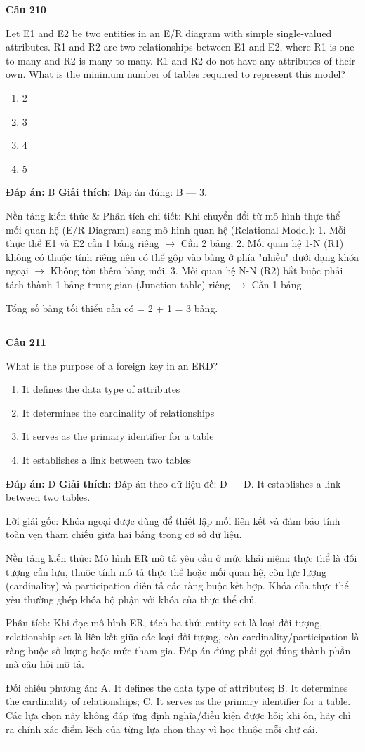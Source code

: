 \documentclass[11pt,a4paper]{article}
\newenvironment{question}[1]{%
  \par\vspace{1em}\noindent\textbf{\large Câu #1}\par\vspace{0.4em}
}{%
  \par\vspace{1em}\hrule\vspace{0.6em}
}
\newenvironment{choices}{%
  \begin{enumerate}[label=\textbf{\Alph*.},leftmargin=2.2em,itemsep=2pt,topsep=3pt]
}{%
  \end{enumerate}
}
\newcommand{\choice}{\item}
\begin{document}
\begin{question}{210}
Let E1 and E2 be two entities in an E/R diagram with simple single-valued attributes. R1 and R2 are two relationships between E1 and E2, where R1 is one-to-many and R2 is many-to-many. R1 and R2 do not have any attributes of their own. What is the minimum number of tables required to represent this model?
\begin{choices}
\choice 2
\choice 3
\choice 4
\choice 5
\end{choices}
\textbf{Đáp án:} B
\textbf{Giải thích:} Đáp án đúng: B — 3.

Nền tảng kiến thức \& Phân tích chi tiết:
Khi chuyển đổi từ mô hình thực thể - mối quan hệ (E/R Diagram) sang mô hình quan hệ (Relational Model):
1. Mỗi thực thể E1 và E2 cần 1 bảng riêng $\to$ Cần 2 bảng.
2. Mối quan hệ 1-N (R1) không có thuộc tính riêng nên có thể gộp vào bảng ở phía "nhiều" dưới dạng khóa ngoại $\to$ Không tốn thêm bảng mới.
3. Mối quan hệ N-N (R2) bắt buộc phải tách thành 1 bảng trung gian (Junction table) riêng $\to$ Cần 1 bảng.

Tổng số bảng tối thiểu cần có = 2 + 1 = 3 bảng.
\end{question}

\begin{question}{211}
What is the purpose of a foreign key in an ERD?
\begin{choices}
\choice It defines the data type of attributes
\choice It determines the cardinality of relationships
\choice It serves as the primary identifier for a table
\choice It establishes a link between two tables
\end{choices}
\textbf{Đáp án:} D
\textbf{Giải thích:} Đáp án theo dữ liệu đề: D — D. It establishes a link between two tables.

Lời giải gốc: Khóa ngoại được dùng để thiết lập mối liên kết và đảm bảo tính toàn vẹn tham chiếu giữa hai bảng trong cơ sở dữ liệu.

Nền tảng kiến thức: Mô hình ER mô tả yêu cầu ở mức khái niệm: thực thể là đối tượng cần lưu, thuộc tính mô tả thực thể hoặc mối quan hệ, còn lực lượng (cardinality) và participation diễn tả các ràng buộc kết hợp. Khóa của thực thể yếu thường ghép khóa bộ phận với khóa của thực thể chủ.

Phân tích: Khi đọc mô hình ER, tách ba thứ: entity set là loại đối tượng, relationship set là liên kết giữa các loại đối tượng, còn cardinality/participation là ràng buộc số lượng hoặc mức tham gia. Đáp án đúng phải gọi đúng thành phần mà câu hỏi mô tả.

Đối chiếu phương án: A. It defines the data type of attributes; B. It determines the cardinality of relationships; C. It serves as the primary identifier for a table. Các lựa chọn này không đáp ứng định nghĩa/điều kiện được hỏi; khi ôn, hãy chỉ ra chính xác điểm lệch của từng lựa chọn thay vì học thuộc mỗi chữ cái.
\end{question}
\end{document}
